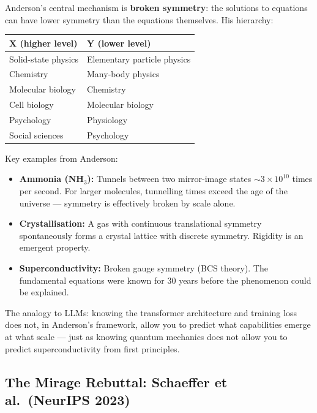 \documentclass[11pt, a4paper]{article}
\theoremstyle{definition}
\theoremstyle{plain}
\begin{document}
Anderson's central mechanism is \textbf{broken symmetry}: the solutions to equations can have lower symmetry than the equations themselves. His hierarchy:

\begin{center}
\begin{tabular}{ll}
  \toprule
  \textbf{X (higher level)} & \textbf{Y (lower level)} \\
  \midrule
  Solid-state physics & Elementary particle physics \\
  Chemistry & Many-body physics \\
  Molecular biology & Chemistry \\
  Cell biology & Molecular biology \\
  Psychology & Physiology \\
  Social sciences & Psychology \\
  \bottomrule
\end{tabular}
\end{center}

Key examples from Anderson:
\begin{itemize}
  \item \textbf{Ammonia (NH$_3$):} Tunnels between two mirror-image states ${\sim}3 \times 10^{10}$ times per second. For larger molecules, tunnelling times exceed the age of the universe --- symmetry is effectively broken by scale alone.
  \item \textbf{Crystallisation:} A gas with continuous translational symmetry spontaneously forms a crystal lattice with discrete symmetry. Rigidity is an emergent property.
  \item \textbf{Superconductivity:} Broken gauge symmetry (BCS theory). The fundamental equations were known for 30 years before the phenomenon could be explained.
\end{itemize}

The analogy to LLMs: knowing the transformer architecture and training loss does not, in Anderson's framework, allow you to predict what capabilities emerge at what scale --- just as knowing quantum mechanics does not allow you to predict superconductivity from first principles.

\subsection{The Mirage Rebuttal: Schaeffer et al.\ (NeurIPS 2023)}
\label{subsec:schaeffer}
\end{document}
